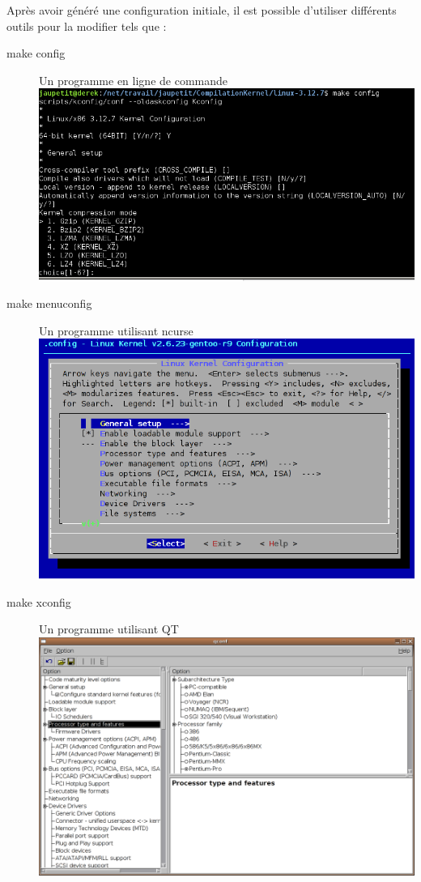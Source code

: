 \documentclass[16pts]{report}
\begin{document}
Après avoir généré une configuration initiale, il est possible d’utiliser
différents outils pour la modifier tels que :

\begin{description}
    \item[make config]      	Un programme en ligne de commande \\
        \includegraphics[scale=0.7]{illustrations/configLine.png} \pagebreak
    \item[make menuconfig]      Un programme utilisant ncurse \\
        \includegraphics[scale=0.7]{illustrations/menuconfig.png} \\
    \item[make xconfig]     	Un programme utilisant QT \\
        \includegraphics[scale=0.4]{illustrations/xconfig.png} \pagebreak

\end{description}
\end{document}
